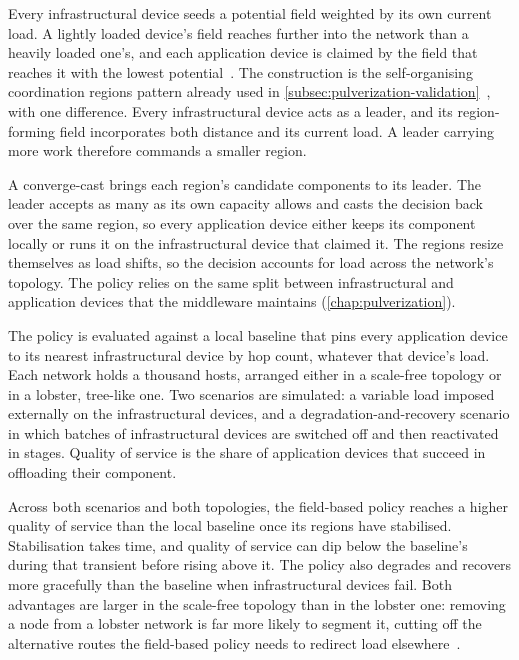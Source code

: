 Every infrastructural device seeds a potential field weighted by its own current load.
%
A lightly loaded device's field reaches further into the network than a heavily loaded one's,
and each application device is claimed by the field that reaches it with the lowest potential~\cite{DBLP:journals/iot/FarabegoliPCV24}.
%
The construction is the self-organising coordination regions pattern already used in \cref{subsec:pulverization-validation}~\cite{DBLP:journals/fgcs/PianiniCVN21}, with one difference.
%
Every infrastructural device acts as a leader,
and its region-forming field incorporates both distance and its current load.
A leader carrying more work therefore commands a smaller region.

A converge-cast brings each region's candidate components to its leader.
%
The leader accepts as many as its own capacity allows and casts the decision back over the same region,
so every application device either keeps its component locally or runs it on the infrastructural device that claimed it.
%
The regions resize themselves as load shifts, so the decision accounts for load across the network's topology.
%
The policy relies on the same split between infrastructural and application devices that the middleware maintains (\cref{chap:pulverization}).

The policy is evaluated against a local baseline that pins every application device to its nearest infrastructural device by hop count, whatever that device's load.
%
Each network holds a thousand hosts, arranged either in a scale-free topology or in a lobster, tree-like one.
%
Two scenarios are simulated:
a variable load imposed externally on the infrastructural devices,
and a degradation-and-recovery scenario in which batches of infrastructural devices are switched off and then reactivated in stages.
%
Quality of service is the share of application devices that succeed in offloading their component.

Across both scenarios and both topologies, the field-based policy reaches a higher quality of service than the local baseline once its regions have stabilised.
%
Stabilisation takes time, and quality of service can dip below the baseline's during that transient before rising above it.
%
The policy also degrades and recovers more gracefully than the baseline when infrastructural devices fail.
%
Both advantages are larger in the scale-free topology than in the lobster one:
removing a node from a lobster network is far more likely to segment it,
cutting off the alternative routes the field-based policy needs to redirect load elsewhere~\cite{DBLP:journals/iot/FarabegoliPCV24}.

